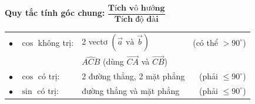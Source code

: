 \documentclass[12pt,a4paper]{article}
\begin{document}
\newpage


\begin{theorybox}
    \vspace{4pt}
    \begin{center}
        \textbf{\textcolor{deepblue}{\large Quy tắc tính góc chung:}}\hskip 14pt
        {\Large\color{accentred} $\mathbf{\dfrac{\text{Tích vô hướng}}{\text{Tích độ dài}}}$}
    \end{center}
    
    \vspace{8pt}
    \centering
    \renewcommand{\arraystretch}{1.6}
    \begin{tabular}{@{} l @{\hskip 12pt} l @{\hskip 28pt} r @{}}
        $\bullet$ \ $\cos$ không trị: & 2 vectơ $(\vec{a} \text{ và } \vec{b})$ & (có thể $> 90^\circ$) \\
                                      & $\widehat{ACB}$ (dùng $\vec{CA}$ và $\vec{CB}$) & \\
        $\bullet$ \ $\cos$ có trị:     & 2 đường thẳng, 2 mặt phẳng            & (phải $\le 90^\circ$) \\
        $\bullet$ \ $\sin$ có trị:     & đường thẳng và mặt phẳng              & (phải $\le 90^\circ$) \\
    \end{tabular}
    \vspace{4pt}
\end{theorybox}

\vspace{0.25cm}
\end{document}
